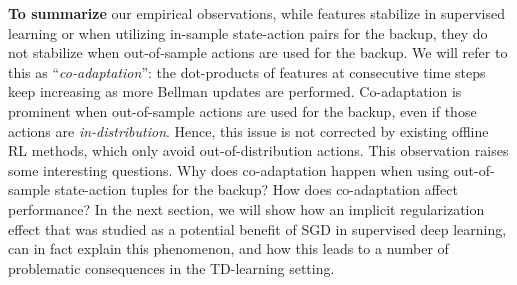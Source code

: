 
\textbf{To summarize} our empirical observations, while features stabilize in supervised learning or when utilizing in-sample state-action pairs for the backup, they do not stabilize when out-of-sample actions are used for the backup. We will refer to this as ``\emph{co-adaptation}'': the dot-products of features at consecutive time steps keep increasing as more Bellman updates are performed. Co-adaptation is prominent when out-of-sample actions are used for the backup, even if those actions are \emph{in-distribution}. Hence, this issue is not corrected by existing offline RL methods, which only avoid out-of-distribution actions.
This observation raises some interesting questions. Why does co-adaptation happen when using out-of-sample state-action tuples for the backup? How does co-adaptation affect performance? In the next section, we will show how an implicit regularization effect that was studied as a potential benefit of SGD in supervised deep learning, can in fact explain this phenomenon, and how this leads to a number of problematic consequences in the TD-learning setting.

